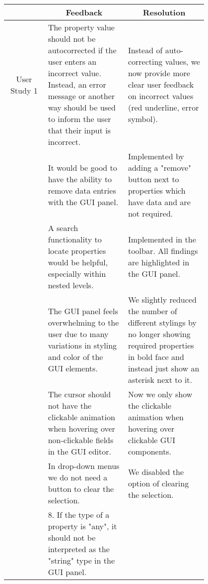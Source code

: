 \begin{table*}
    \vspace{-10pt}
    \centering
    \small %
    \setlength{\extrarowheight}{5pt} %
    \renewcommand{\arraystretch}{1.5} %
    \begin{tabular}{|c|p{0.4\linewidth}|p{0.4\linewidth}|}
        \hline
        \multicolumn{1}{|c|}{} & \multicolumn{1}{|c|}{Feedback} & \multicolumn{1}{|c|}{Resolution} \\
        \cline{2-3}
        \hline
        User Study 1 & The property value should not be autocorrected if the user enters an incorrect value. 
        Instead, an error message or another way should be used to inform the user that their input is incorrect. & 
        Instead of auto-correcting values, we now provide more clear user feedback on incorrect values (red underline, error symbol). \\
        \cline{2-3}
        & It would be good to have the ability to remove data entries with the GUI panel. & 
        Implemented by adding a "remove" button next to properties which have data and are not required. \\
        \cline{2-3}
        & A search functionality to locate properties would be helpful, especially within nested levels.
        & Implemented in the toolbar. All findings are highlighted in the GUI panel. \\
        \cline{2-3}
        \cline{2-3}
        & The GUI panel feels overwhelming to the user due to many variations in styling and color of the GUI elements. & 
        We slightly reduced the number of different stylings by no longer showing required properties in bold face and instead just show an asterisk next to it. \\
        \cline{2-3}
        & The cursor should not have the clickable animation when hovering over non-clickable fields in the GUI editor. & Now we only show the clickable animation when hovering over clickable GUI components. \\
        \cline{2-3}
        & In drop-down menus we do not need a button to clear the selection. & 
        We disabled the option of clearing the selection. \\
        \cline{2-3}
        & 8. If the type of a property is "any", it should not be interpreted as the "string" type in the GUI panel. & 

\end{tabular}
\end{table*}
